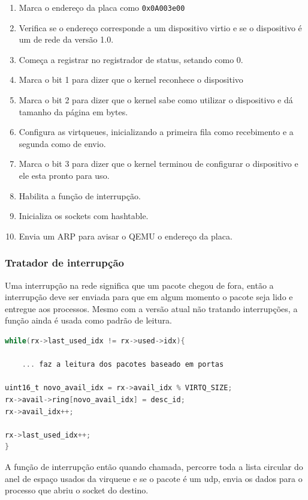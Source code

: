 \begin{enumerate}
\item Marca o endereço da placa como \texttt{0x0A003e00}
\item Verifica se o endereço corresponde a um dispositivo virtio e se o dispositivo é um de rede da versão 1.0.
\item Começa a registrar no registrador de status, setando como 0.
\item Marca o bit 1 para dizer que o kernel reconhece o dispositivo
\item Marca o bit 2 para dizer que o kernel sabe como utilizar o dispositivo e dá tamanho da página em bytes.
\item Configura as virtqueues, inicializando a primeira fila como recebimento e a segunda como de envio.
\item Marca o bit 3 para dizer que o kernel terminou de configurar o dispositivo e ele esta pronto para uso.
\item Habilita a função de interrupção.
\item Inicializa os sockets com hashtable.
\item Envia um ARP para avisar o QEMU o endereço da placa.
\end{enumerate}

\subsubsection{Tratador de interrupção}

Uma interrupção na rede significa que um pacote chegou de fora, então a interrupção deve ser enviada para que em algum momento o pacote seja lido e entregue aos processos. Mesmo com a versão atual não tratando interrupções, a função ainda é usada como padrão de leitura.

\begin{lstlisting}[language=C]
while(rx->last_used_idx != rx->used->idx){

    ... faz a leitura dos pacotes baseado em portas

uint16_t novo_avail_idx = rx->avail_idx % VIRTQ_SIZE;
rx->avail->ring[novo_avail_idx] = desc_id;
rx->avail_idx++;
                
rx->last_used_idx++;
}
\end{lstlisting}

A função de interrupção então quando chamada, percorre toda a lista circular do anel de espaço usados da virqueue e se o pacote é um udp, envia os dados para o processo que abriu o socket do destino.

